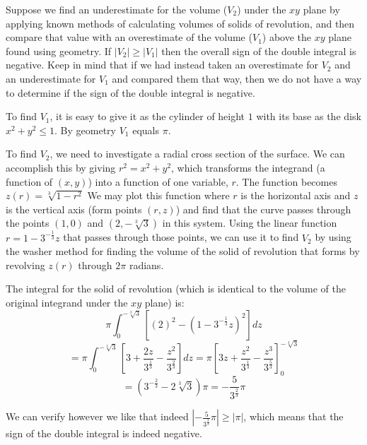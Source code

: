 \documentclass{article}
\begin{document}
Suppose we find an underestimate for the volume ($V_2$) under the $xy$ plane by applying known methods of calculating volumes of solids of revolution, and then compare that value with an overestimate of the volume ($V_1$) above the $xy$ plane found using geometry. If $|V_2| \geq |V_1|$ then the overall sign of the double integral is negative. Keep in mind that if we had instead taken an overestimate for $V_2$ and an underestimate for $V_1$ and compared them that way, then we do not have a way to determine if the sign of the double integral is negative.

To find $V_1$, it is easy to give it as the cylinder of height $1$ with its base as the disk $x^2+y^2 \leq 1$. By geometry $V_1$ equals $\pi$.

To find $V_2$, we need to investigate a radial cross section of the surface. We can accomplish this by giving $r^2 = x^2+y^2$, which transforms the integrand (a function of $(x,y)$) into a function of one variable, $r$. The function becomes $z(r) = \sqrt[3]{1-r^2}$ We may plot this function where $r$ is the horizontal axis and $z$ is the vertical axis (form points $(r,z)$) and find that the curve passes through the points $(1,0)$ and $(2,-\sqrt[3]{3})$ in this system. Using the linear function $r = 1-3^{-\frac{1}{3}}z$ that passes through those points, we can use it to find $V_2$ by using the washer method for finding the volume of the solid of revolution that forms by revolving $z(r)$ through $2\pi$ radians.

The integral for the solid of revolution (which is identical to the volume of the original integrand under the $xy$ plane) is:
$$\pi\int_0^{-\sqrt[3]{3}}\left[(2)^2-(1-3^{-\frac{1}{3}}z)^2\right]dz$$
$$= \pi\int_0^{-\sqrt[3]{3}}\left[3 + \frac{2 z}{3^{\frac{1}{3}}} - \frac{z^2}{3^{\frac{2}{3}}}\right]dz = \pi\left[3z + \frac{ z^2}{3^{\frac{1}{3}}} - \frac{z^3}{3^{\frac{5}{3}}}\right]_0^{-\sqrt[3]{3}}$$
$$ = \left(3^{-\frac{2}{3}} - 2\sqrt[3]{3}\right) \pi = -\frac{5}{3^{\frac{2}{3}}}\pi$$

We can verify however we like that indeed $|-\frac{5}{3^{\frac{2}{3}}}\pi| \geq |\pi|$, which means that the sign of the double integral is indeed negative.
\end{document}
